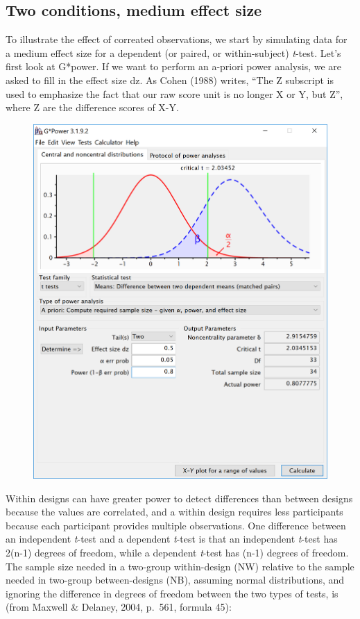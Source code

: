 \documentclass[]{article}
\begin{document}
\subsection{Two conditions, medium effect
size}\label{two-conditions-medium-effect-size}

To illustrate the effect of correated observations, we start by
simulating data for a medium effect size for a dependent (or paired, or
within-subject) \emph{t}-test. Let's first look at G*power. If we want
to perform an a-priori power analysis, we are asked to fill in the
effect size dz. As Cohen (1988) writes, ``The Z subscript is used to
emphasize the fact that our raw score unit is no longer X or Y, but Z'',
where Z are the difference scores of X-Y.

\begin{figure}
\centering
\includegraphics{screenshots/gpower_9.png}
\caption{}
\end{figure}

Within designs can have greater power to detect differences than between
designs because the values are correlated, and a within design requires
less participants because each participant provides multiple
observations. One difference between an independent \emph{t}-test and a
dependent \emph{t}-test is that an independent \emph{t}-test has 2(n-1)
degrees of freedom, while a dependent \emph{t}-test has (n-1) degrees of
freedom. The sample size needed in a two-group within-design (NW)
relative to the sample needed in two-group between-designs (NB),
assuming normal distributions, and ignoring the difference in degrees of
freedom between the two types of tests, is (from Maxwell \& Delaney,
2004, p.~561, formula 45):
\end{document}
